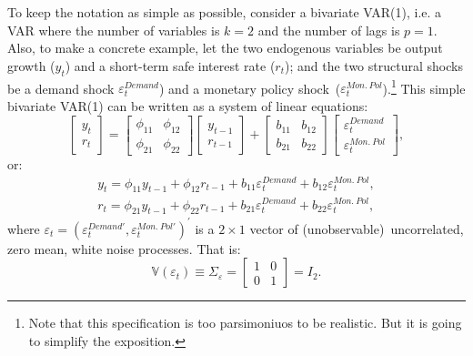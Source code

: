 \documentclass[10pt]{article}
\begin{document}
To keep the notation as simple as possible, consider a bivariate VAR(1),
i.e. a VAR where the number of variables is $k=2$ and the number of lags is $%
p=1$. Also, to make a concrete example, let the two endogenous variables be
output growth ($y_{t}$) and a short-term safe interest rate ($r_{t}$); and
the two structural shocks be a demand shock $\varepsilon _{t}^{Demand}$) and
a monetary policy shock\ ($\varepsilon _{t}^{Mon.\ Pol}$).\footnote{%
Note that this specification is too parsimoniuos to be realistic. But it is
going to simplify the exposition.} This simple bivariate VAR(1) can be
written as a system of linear equations:%
\begin{equation}
\begin{bmatrix}
y_{t} \\
r_{t}%
\end{bmatrix}%
=%
\begin{bmatrix}
\phi _{11} & \phi _{12} \\
\phi _{21} & \phi _{22}%
\end{bmatrix}%
\begin{bmatrix}
y_{t-1} \\
r_{t-1}%
\end{bmatrix}%
+%
\begin{bmatrix}
b_{11} & b_{12} \\
b_{21} & b_{22}%
\end{bmatrix}%
\begin{bmatrix}
\varepsilon _{t}^{Demand} \\
\varepsilon _{t}^{Mon.\ Pol}%
\end{bmatrix}%
,  \label{eq:struct_var_1}
\end{equation}%
or:%
\begin{equation}
\begin{array}{c}
y_{t}=\phi _{11}y_{t-1}+\phi _{12}r_{t-1}+b_{11}\varepsilon
_{t}^{Demand}+b_{12}\varepsilon _{t}^{Mon.\ Pol}, \\
r_{t}=\phi _{21}y_{t-1}+\phi _{22}r_{t-1}+b_{21}\varepsilon
_{t}^{Demand}+b_{22}\varepsilon _{t}^{Mon.\ Pol},%
\end{array}
\label{eq:struct_var_2}
\end{equation}%
where $\varepsilon _{t}=(\varepsilon _{t}^{Demand\prime },\varepsilon
_{t}^{Mon.\ Pol\prime })^{\prime }$ is a $2\times 1$ vector of
(unobservable)\ uncorrelated, zero mean, white noise processes. That is:%
\begin{equation}
\mathbb{V}(\varepsilon _{t})\equiv \Sigma _{\varepsilon }=\left[
\begin{array}{cc}
1 & 0 \\
0 & 1%
\end{array}%
\right] =I_{2}.  \label{eq:struct_cov_1}
\end{equation}%
\end{document}
